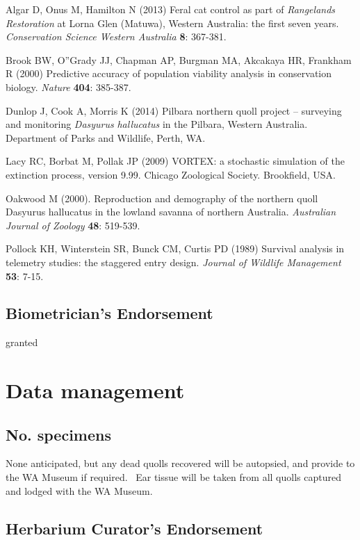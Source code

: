 \documentclass[version=last,
    paper=a4,                               %
    10pt,                                   %
    dvipsnames,
    oneside,                              %
    headings=openany,                       %
    open=any,
    BCOR=7mm,                               %
    DIV=15,     %
]{scrbook}
\begin{document}
Algar D, Onus M, Hamilton N (2013) Feral cat control as part of
\emph{Rangelands Restoration} at Lorna Glen (Matuwa), Western Australia:
the first seven years. \emph{Conservation Science Western Australia}
\textbf{8}: 367-381.

Brook BW, O''Grady JJ, Chapman AP, Burgman MA, Akcakaya HR, Frankham R
(2000) Predictive accuracy of population viability analysis in
conservation biology. \emph{Nature} \textbf{404}: 385-387.

Dunlop J, Cook A, Morris K (2014) Pilbara northern quoll project --
surveying and monitoring \emph{Dasyurus} \emph{hallucatus} in the
Pilbara, Western Australia. Department of Parks and Wildlife, Perth, WA.

Lacy RC, Borbat M, Pollak JP (2009) VORTEX: a stochastic simulation of
the extinction process, version 9.99. Chicago Zoological Society.
Brookfield, USA.

Oakwood M (2000). Reproduction and demography of the northern quoll
Dasyurus hallucatus in the lowland savanna of northern Australia.
\emph{Australian Journal of Zoology} \textbf{48}: 519-539.

Pollock KH, Winterstein SR, Bunck CM, Curtis PD (1989) Survival analysis
in telemetry studies: the staggered entry design. \emph{Journal of
Wildlife Management} \textbf{53}: 7-15.




\subsection*{Biometrician's Endorsement}

granted



\section*{Data management}


\subsection*{No. specimens}

\textenglish[variant=american]{None anticipated, but any dead quolls
recovered will be autopsied, and provide to the WA Museum if required.~
Ear tissue will be taken from all quolls captured and lodged with the WA
Museum.}




\subsection*{Herbarium Curator's Endorsement}
\end{document}
